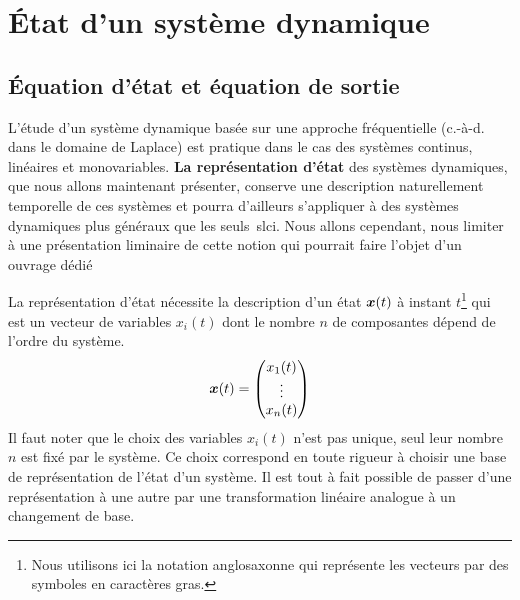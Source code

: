 \section{\'Etat d'un système dynamique}
\subsection{\'Equation d'état et équation de sortie}
L'étude d'un système dynamique basée sur une approche fréquentielle (c.-à-d. 
dans le domaine de Laplace) est pratique dans le cas des systèmes continus, 
linéaires et monovariables. \textbf{La représentation d'état} des systèmes 
dynamiques, que nous allons maintenant présenter, conserve une description 
naturellement temporelle de ces systèmes et pourra d'ailleurs s'appliquer 
à des systèmes dynamiques plus généraux que les seuls~\gls{slci}. 
Nous allons cependant, nous limiter à une présentation
liminaire de cette notion qui pourrait faire l'objet d'un ouvrage dédié

La représentation d'état nécessite la description d'un état 
$\boldsymbol{x}(t)$ à instant $t$\footnote{Nous utilisons ici la notation anglosaxonne qui
représente les vecteurs par des symboles en caractères gras.} qui est un 
vecteur de variables $x_i(t)$ dont le nombre $n$ de composantes dépend 
de l'ordre du système.
\begin{align*}
    \boldsymbol{x} (t) = \begin{pmatrix}
            x_1(t)\\
            \vdots\\
             x_n(t)
            \end{pmatrix}
\end{align*}
Il faut noter que le choix des variables $x_i(t)$ n'est pas unique, seul leur
nombre $n$ est fixé par le système. Ce choix correspond en toute rigueur
à choisir une base de représentation de l'état d'un système. Il est tout à 
fait possible de passer d'une représentation à une autre par une transformation
linéaire analogue à un changement de base.

